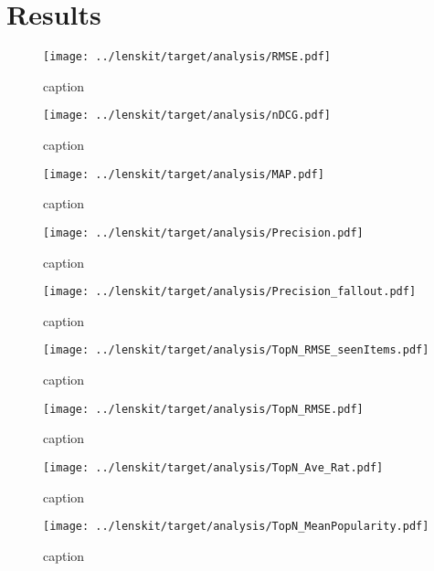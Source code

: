 \documentclass[letterpaper]{sig-alternate}
\begin{document}
\section{Results}

\begin{figure}
\centering
\texttt{[image: ../lenskit/target/analysis/RMSE.pdf]}
\caption{caption}
\label{fig:rmse}
\end{figure}

\begin{figure}
\centering
\texttt{[image: ../lenskit/target/analysis/nDCG.pdf]}
\caption{caption}
\label{fig:ndcg}
\end{figure}

\begin{figure}
\centering
\texttt{[image: ../lenskit/target/analysis/MAP.pdf]}
\caption{caption}
\label{fig:map}
\end{figure}

\begin{figure}
\centering
\texttt{[image: ../lenskit/target/analysis/Precision.pdf]}
\caption{caption}
\label{fig:precision}
\end{figure}

\begin{figure}
\centering
\texttt{[image: ../lenskit/target/analysis/Precision\_fallout.pdf]}
\caption{caption}
\label{fig:fallout}
\end{figure}

\begin{figure}
\centering
\texttt{[image: ../lenskit/target/analysis/TopN\_RMSE\_seenItems.pdf]}
\caption{caption}
\label{fig:topn.rmse.seen}
\end{figure}

\begin{figure}
\centering
\texttt{[image: ../lenskit/target/analysis/TopN\_RMSE.pdf]}
\caption{caption}
\label{fig:topn.rmse}
\end{figure}

\begin{figure}
\centering
\texttt{[image: ../lenskit/target/analysis/TopN\_Ave\_Rat.pdf]}
\caption{caption}
\label{fig:topn.avg.rat}
\end{figure}

\begin{figure}
\centering
\texttt{[image: ../lenskit/target/analysis/TopN\_MeanPopularity.pdf]}
\caption{caption}
\label{fig:pop}
\end{figure}
\end{document}
